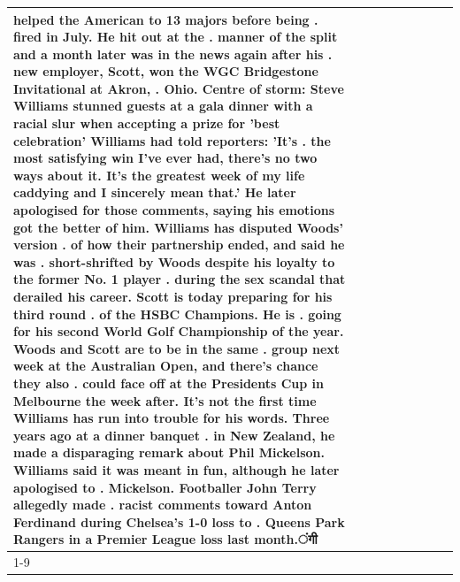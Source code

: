 \begin{table}[H]
\begin{tabular}{lllrlllll}
helped the American to 13 majors before being . fired in July. He hit out at the . manner of the split and a month later was in the news again after his . new employer, Scott, won the WGC Bridgestone Invitational at Akron, . Ohio. Centre of storm: Steve Williams stunned guests at a gala dinner with a racial slur when accepting a prize for 'best celebration' Williams had told reporters: 'It's . the most satisfying win I've ever had, there's no two ways about it. It's the greatest week of my life caddying and I sincerely mean that.' He later apologised for those comments, saying his emotions got the better of him. Williams has disputed Woods' version . of how their partnership ended, and said he was . short-shrifted by Woods despite his loyalty to the former No. 1 player . during the sex scandal that derailed his career. Scott is today preparing for his third round . of the HSBC Champions. He is . going for his second World Golf Championship of the year. Woods and Scott are to be in the same . group next week at the Australian Open, and there's chance they also . could face off at the Presidents Cup in Melbourne the week after. It's not the first time Williams has run into trouble for his words. Three years ago at a dinner banquet . in New Zealand, he made a disparaging remark about Phil Mickelson. Williams said it was meant in fun, although he later apologised to . Mickelson. Footballer John Terry allegedly made . racist comments toward Anton Ferdinand during Chelsea's 1-0 loss to . Queens Park Rangers in a Premier League loss last month.ंगी \\
\cline{1-9}

\end{tabular}
\end{table}
